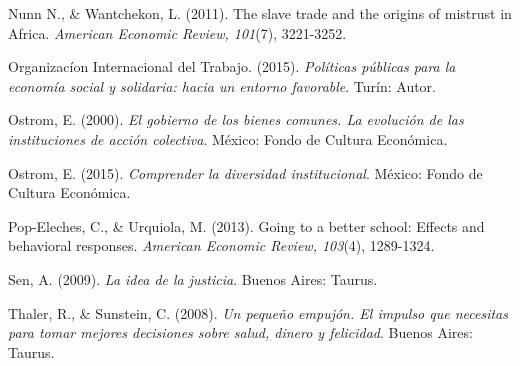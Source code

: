 \documentclass[12]{article}
\begin{document}
\begin{hangparas}{.25in}{1}
Nunn N., \& Wantchekon, L. (2011). The slave trade and the origins of mistrust in Africa. \textit{American Economic Review, 101}(7), 3221-3252. 

Organizacíon Internacional del Trabajo. (2015). \textit{Políticas públicas para la economía social y solidaria: hacia un entorno favorable}. Turín: Autor.  

Ostrom, E. (2000). \textit{El gobierno de los bienes comunes. La evolución de las instituciones de acción colectiva}. México: Fondo de Cultura Económica.

Ostrom, E. (2015). \textit{Comprender la diversidad institucional}. México: Fondo de Cultura Económica. 

Pop-Eleches, C., \& Urquiola, M. (2013). Going to a better school: Effects and behavioral responses.\textit{ American Economic Review, 103}(4), 1289-1324. 

Sen, A. (2009). \textit{La idea de la justicia}. Buenos Aires: Taurus. 

Thaler, R., \& Sunstein, C. (2008).\textit{ Un pequeño empujón. El impulso que necesitas para tomar mejores decisiones sobre salud, dinero y 
felicidad}.  Buenos Aires: Taurus. 
\end{hangparas}
\end{document}

